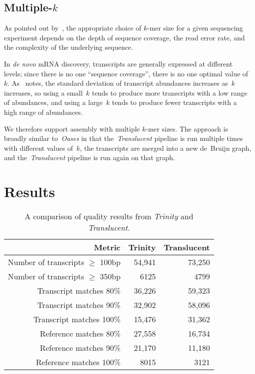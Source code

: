 \documentclass{bioinfo}
\def\Translucent{\textit{Translucent}}
\def\Trinity{\textit{Trinity}}
\def\Oases{\textit{Oases}}
\def\denovo{\textit{de novo}}
\def\kmer{$k$-mer}
\begin{document}
\subsection{Multiple-$k$}\label{sect:multik}

As pointed out by~\cite{Simpson:2009}, the appropriate choice of
\kmer{} size for a given sequencing experiment depends on the depth
of sequence coverage, the read error rate, and the complexity of
the underlying sequence.

In \denovo{} mRNA discovery, transcripts are generally expressed
at different levels; since there is no one ``sequence coverage'',
there is no one optimal value of~$k$.
As~\cite{SurgetGroba:2010}
notes, the standard deviation of transcript abundances increases
as~$k$ increases, so using a small~$k$ tends to produce more
transcripts with a low range of abundances, and using a large~$k$
tends to produce fewer transcripts with a high range of abundances.

We therefore support assembly with multiple \kmer{} sizes.
The approach is broadly similar to~\Oases{} in that the~\Translucent{}
pipeline is run multiple times with different values of~$k$, the
transcripts are merged into a new de~Bruijn graph, and the~\Translucent{}
pipeline is run again on that graph.

\section{Results}

\begin{table}
\label{tab:results}
\begin{tabular}{|r|r|r|}
\hline
Metric & Trinity & Translucent \\
\hline
Number of transcripts $\ge$ 100bp &  54,941 & 73,250 \\
Number of transcripts $\ge$ 350bp &    6125 &   4799 \\
Transcript matches \@ 80\%        &  36,226 & 59,323 \\
Transcript matches \@ 90\%        &  32,902 & 58,096 \\
Transcript matches \@ 100\%       &  15,476 & 31,362 \\
Reference matches \@ 80\%         &  27,558 & 16,734 \\
Reference matches \@ 90\%         &  21,170 & 11,180 \\
Reference matches \@ 100\%        &    8015 &   3121 \\
\hline
\end{tabular}
\caption{A comparison of quality results from \Trinity{} and \Translucent{}.}
\end{table}
\end{document}
